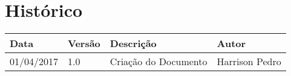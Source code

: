 \chapter{Histórico}

\begin{tabular}{ |p{3cm}|p{3cm}|p{3cm}|p{3cm}|  }
 \hline
 Data 		& 		Versão & 		Descrição 			& 		Autor\\
 \hline\hline
 01/04/2017 & 		1.0    &		Criação do Documento &   	Harrison Pedro \\ 
 \hline

\end{tabular}

